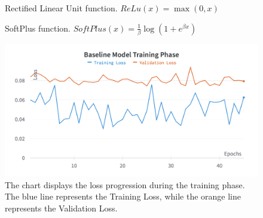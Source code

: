 \begin{minipage}[t]{0.45\textwidth}
	\begin{figure}[H]
		\centering
		\caption{Rectified Linear Unit function. $ReLu(x) = \max(0, x)$}
		\label{fig:relu}
	\end{figure}
\end{minipage}%
\hspace{.5cm}
\begin{minipage}[t]{0.45\textwidth}
	\begin{figure}[H]
		\centering
		\caption{SoftPlus function. $SoftPlus(x) = \frac{1}{\beta} \log(1+e^{\beta x})$}
		\label{fig:softplus}
	\end{figure}
\end{minipage}

\begin{figure}[H]
	\centering
	\includegraphics[width=.8\textwidth]{chapters/3_models/imgs/ufnc/ufnctraining.png}
	\caption{The chart displays the loss progression during the training phase. The blue line represents the Training Loss, while the orange line represents the Validation Loss.}
	\label{fig:ufcntraining}
\end{figure}

